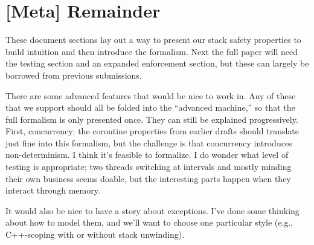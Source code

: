 \documentclass[10pt,conference]{ieeetran}%
\theoremstyle{definition}
\begin{document}

\section*{[Meta] Remainder}

These document sections lay out a way to present our stack safety properties to build intuition and
then introduce the formalism. Next the full paper will need the testing section and an expanded
enforcement section, but these can largely be borrowed from previous submissions.

There are some advanced features that would be nice to work in. Any of these that we support should
all be folded into the ``advanced machine,'' so that the full formalism is only presented once.
They can still be explained progressively. First, concurrency: the coroutine properties from earlier
drafts should translate just fine into this formalism, but the challenge is that concurrency introduces
non-determinism. I think it's feasible to formalize. I do wonder what level of testing is appropriate;
two threads switching at intervals and mostly minding their own business seems doable, but the interesting
parts happen when they interact through memory.

It would also be nice to have a story about exceptions. I've done some thinking about how to model them,
and we'll want to choose one particular style (e.g., C++-scoping with or without stack unwinding).



\end{document}
